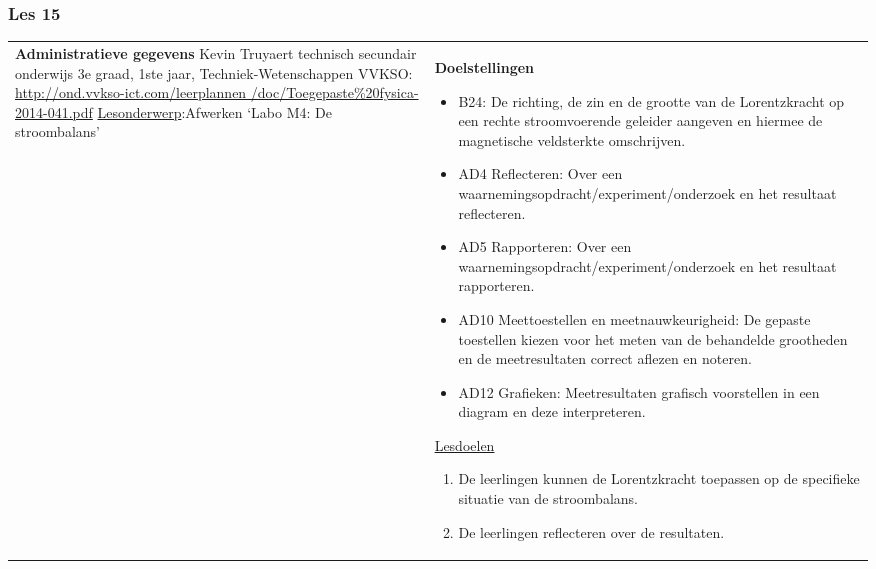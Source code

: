 


\begin{landscape}
	\subsubsection{Les 15}
	\begin{tabularx}{1.56\textwidth}{|p{}|X|}\hline
		\textbf{Administratieve gegevens}\newline\newline
		Kevin Truyaert\newline\newline
		technisch secundair onderwijs\newline
		3e graad, 1ste jaar, Techniek-Wetenschappen\newline
		VVKSO: \href{http://ond.vvkso-ict.com/leerplannen/doc/Toegepaste\%20fysica-2014-041.pdf}{http://ond.vvkso-ict.com/leerplannen /doc/Toegepaste\%20fysica-2014-041.pdf} \newline
		\underline{Lesonderwerp}:\newline Afwerken `Labo M4: De stroombalans' & \textbf{Doelstellingen}
		\begin{itemize}[itemsep=0.08\baselineskip]
			\item B24: De richting, de zin en de grootte van de Lorentzkracht op een rechte stroomvoerende geleider aangeven en hiermee de magnetische veldsterkte omschrijven. 
			\item AD4 Reflecteren: Over een waarnemingsopdracht/experiment/onderzoek en het resultaat reflecteren.
			\item AD5 Rapporteren: Over een waarnemingsopdracht/experiment/onderzoek en het resultaat rapporteren.
			\item AD10 Meettoestellen en meetnauwkeurigheid: De gepaste toestellen kiezen voor het meten van de behandelde grootheden en de meetresultaten correct aflezen en noteren.
			\item AD12 Grafieken: Meetresultaten grafisch voorstellen in een diagram en deze interpreteren.
		\end{itemize}
		\underline{Lesdoelen}\newline
		\vspace{-0.75cm}
		\begin{enumerate}[itemsep=0.08\baselineskip]
			\item De leerlingen kunnen de Lorentzkracht toepassen op de specifieke situatie van de stroombalans.
			\item De leerlingen reflecteren over de resultaten.

\end{enumerate}
\end{tabularx}
\end{landscape}
